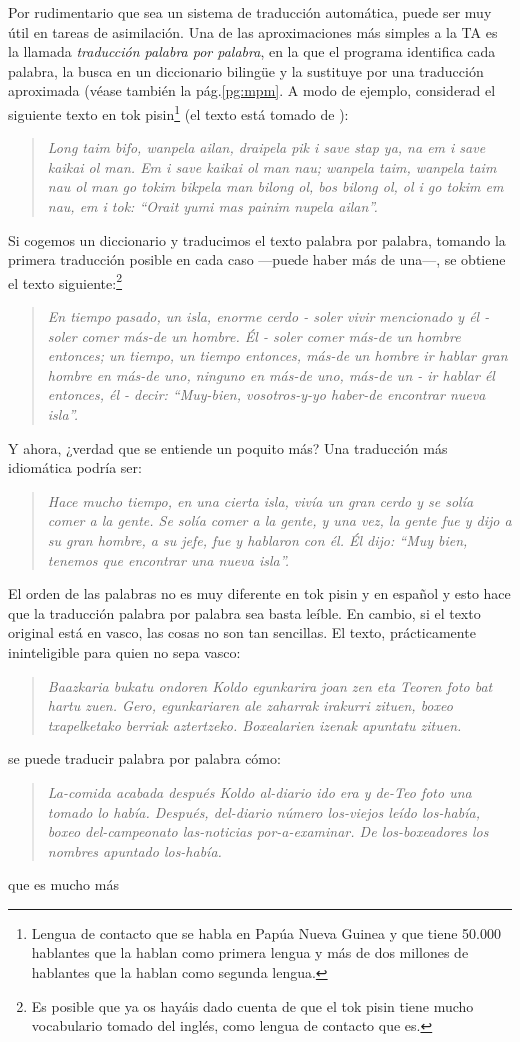 Por rudimentario que sea un sistema de traducción automática, puede ser muy útil en tareas de asimilación. Una de las aproximaciones más simples a la TA es la llamada \emph{traducción palabra por palabra}, en la que el programa identifica cada palabra, la busca en un diccionario bilingüe y la sustituye por una traducción aproximada (véase también la pág.\ref{pg:mpm}. A modo de ejemplo, considerad el siguiente texto en tok pisin\footnote{Lengua de contacto que se habla en Papúa Nueva Guinea y que tiene 50.000 hablantes que la hablan como primera lengua y más de dos millones de hablantes que la hablan como segunda lengua.} (el texto está tomado de \citealt{lyovin97b}): \begin{quote}{\sl Long taim bifo, wanpela ailan, draipela pik i save stap ya, na em i save kaikai ol man. Em i save kaikai ol man nau; wanpela taim, wanpela taim nau ol man go tokim bikpela man bilong ol, bos bilong ol, ol i go tokim em nau, em i tok: ``Orait yumi mas painim nupela ailan''. } \end{quote} Si cogemos un diccionario y traducimos el texto palabra por palabra, tomando la primera traducción posible en cada caso ---puede haber más de una---, se obtiene el texto siguiente:\footnote{Es posible que ya os hayáis dado cuenta de que el tok pisin tiene mucho vocabulario tomado del inglés, como lengua de contacto que es.} \begin{quote}{\sl En tiempo pasado, un isla, enorme cerdo - soler vivir mencionado y él - soler comer más-de un hombre. Él - soler comer más-de un hombre entonces; un tiempo, un tiempo entonces, más-de un hombre ir hablar gran hombre en más-de uno, ninguno en más-de uno, más-de un - ir hablar él entonces, él - decir: ``Muy-bien, vosotros-y-yo haber-de encontrar nueva isla''.} \end{quote} Y ahora, ¿verdad que se entiende un poquito más? Una traducción más idiomática podría ser: \begin{quote}{\sl Hace mucho tiempo, en una cierta isla, vivía un gran cerdo y se solía comer a la gente. Se solía comer a la gente, y una vez, la gente fue y dijo a su gran hombre, a su jefe, fue y hablaron con él. Él dijo: ``Muy bien, tenemos que encontrar una nueva isla''.} \end{quote} El orden de las palabras no es muy diferente en tok pisin y en español y esto hace que la traducción palabra por palabra sea basta leíble. En cambio, si el texto original está en vasco, las cosas no son tan sencillas. El texto, prácticamente ininteligible para quien no sepa vasco: \begin{quote}{\sl Baazkaria bukatu ondoren Koldo egunkarira joan zen eta Teoren foto bat hartu zuen. Gero, egunkariaren ale zaharrak irakurri zituen, boxeo txapelketako berriak aztertzeko. Boxealarien izenak apuntatu zituen.} \end{quote} se puede traducir palabra por palabra cómo: \begin{quote}{\sl La-comida acabada después Koldo al-diario ido era y de-Teo foto una tomado lo había. Después, del-diario número los-viejos leído los-había, boxeo del-campeonato las-noticias por-a-examinar. De los-boxeadores los nombres apuntado los-había.} \end{quote} que es mucho más 